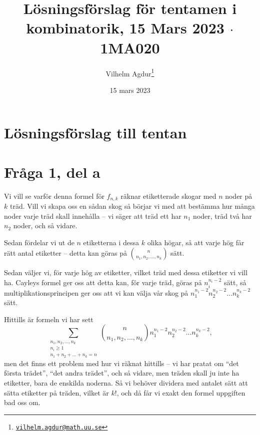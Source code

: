 \documentclass[nobib]{tufte-handout}
\title{Lösningsförslag för tentamen i kombinatorik, 15 Mars 2023 $\cdot$ 1MA020}
\author[Vilhelm Agdur]{Vilhelm Agdur\thanks{\href{mailto:vilhelm.agdur@math.uu.se}{\nolinkurl{vilhelm.agdur@math.uu.se}}}}
\date{15 mars 2023}
\begin{document}

\maketitle%

\begin{abstract}
\noindent

\end{abstract}

\section{Lösningsförslag till tentan}

\section{Fråga 1, del a}

Vi vill se varför denna formel för $f_{n,k}$ räknar etiketterade skogar med $n$ noder på $k$ träd. Vill vi skapa oss en sådan skog så börjar vi med att bestämma hur många noder varje träd skall innehålla -- vi säger att träd ett har $n_1$ noder, träd två har $n_2$ noder, och så vidare.

Sedan fördelar vi ut de $n$ etiketterna i dessa $k$ olika högar, så att varje hög får rätt antal etiketter -- detta kan göras på $\binom{n}{n_1, n_2, \ldots, n_k}$ sätt.

Sedan väljer vi, för varje hög av etiketter, vilket träd med dessa etiketter vi vill ha. Cayleys formel ger oss att detta kan, för varje träd, göras på $n_i^{n_i-2}$ sätt, så multiplikationsprincipen ger oss att vi kan välja vår skog på $n_1^{n_1-2}n_2^{n_2-2}\ldots n_k^{n_k-2}$ sätt.

Hittills är formeln vi har sett
$$\sum_{\substack{n_1, n_2, \ldots, n_k\\ n_i \geq 1\\n_1 + n_2 + \ldots + n_k = n}} \binom{n}{n_1, n_2, \ldots, n_k}n_1^{n_1-2}n_2^{n_2-2}\ldots n_k^{n_k-2},$$
men det finns ett problem med hur vi räknat hittills -- vi har pratat om ``det första trädet'', ``det andra trädet'', och så vidare, men träden skall ju inte ha etiketter, bara de enskilda noderna. Så vi behöver dividera med antalet sätt att sätta etiketter på träden, vilket är $k!$, och då får vi exakt den formel uppgiften bad oss om.



%
%
\end{document}
